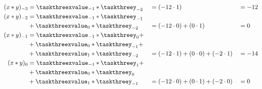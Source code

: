\documentclass[a4paper]{article}
\theoremstyle{break}
\theoremstyle{break}
\begin{document}
\begin{alignat*}{3}
  (x \ast y)_{-3} &= \taskthreexvalue_{-1} \ast \taskthreey_{-2} &&= (-12 \cdot 1) &&= -12 \\
  (x \ast y)_{-2} &= \taskthreexvalue_{-1} \ast \taskthreey_{-1} &&&&\\
    &+ \taskthreexvalue_{0} \ast \taskthreey_{-2} &&= (-12 \cdot 0) + (0 \cdot 1) &&= 0 \\
  (x \ast y)_{-1} &= \taskthreexvalue_{-1} \ast \taskthreey_{0} + \\ 
    &+ \taskthreexvalue_{0} \ast \taskthreey_{-1} + &&&& \\
    &+ \taskthreexvalue_{1} \ast \taskthreey_{-2} &&= (-12 \cdot 1) + (0 \cdot 0) + (-2 \cdot 1) &&= -14 \\
  (x \ast y)_{0} &= \taskthreexvalue_{-1} \ast \taskthreey_{1} + &&&&\\
    &+ \taskthreexvalue_{0} \ast \taskthreey_{0} &&&&\\
    &+ \taskthreexvalue_{1} \ast \taskthreey_{-1} &&= (-12 \cdot 0) + (0 \cdot 1) + (-2 \cdot 0) &&= 0 \\
\end{alignat*}
\end{document}
